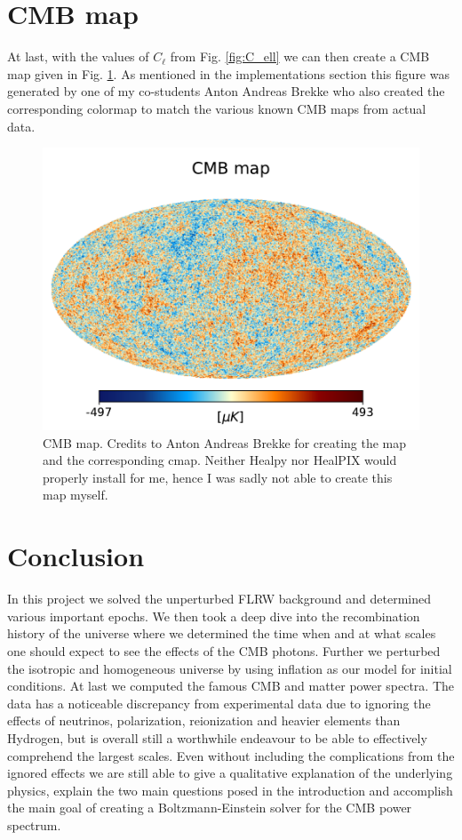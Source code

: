 \documentclass[%
reprint,
 amsmath,amssymb,
 aps,
]{revtex4-2}
\begin{document}
\section{CMB map}
At last, with the values of $C_\ell$ from Fig. \ref{fig:C_ell} we can then create a CMB map given in Fig. \ref{fig:CMB_Map}. As mentioned in the implementations section this figure was generated by one of my co-students Anton Andreas Brekke who also created the corresponding colormap to match the various known CMB maps from actual data. 
\begin{figure}[ht!]
	\includegraphics[width = \linewidth]{Milestone4/Figures/CMB_map.pdf}
	\caption{CMB map. Credits to Anton Andreas Brekke for creating the map and the corresponding cmap. Neither Healpy nor HealPIX would properly install for me, hence I was sadly not able to create this map myself.}
	\label{fig:CMB_Map}
\end{figure}

\section{Conclusion}
In this project we solved the unperturbed FLRW background and determined various important epochs. We then took a deep dive into the recombination history of the universe where we determined the time when and at what scales one should expect to see the effects of the CMB photons. Further we perturbed the isotropic and homogeneous universe by using inflation as our model for initial conditions. At last we computed the famous CMB and matter power spectra. The data has a noticeable discrepancy from experimental data due to ignoring the effects of neutrinos, polarization, reionization and heavier elements than Hydrogen, but is overall still a worthwhile endeavour to be able to effectively comprehend the largest scales. Even without including the complications from the ignored effects we are still able to give a qualitative explanation of the underlying physics, explain the two main questions posed in the introduction and accomplish the main goal of creating a Boltzmann-Einstein solver for the CMB power spectrum.
\end{document}
